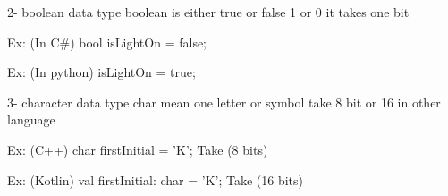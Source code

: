 
  2- boolean data type 
    boolean is either true or false 
    1   or   0 
     it takes one bit

    Ex:   (In C#)
      bool isLightOn = false;
    
    Ex:   (In python)
      isLightOn = true;


  3- character data type  
    char mean one letter or symbol   
    take 8 bit or 16 in other language 

    Ex:  (C++)
      char firstInitial = 'K';
      Take (8 bits)

    Ex:   (Kotlin)
      val firstInitial: char = 'K';
            Take (16 bits)



